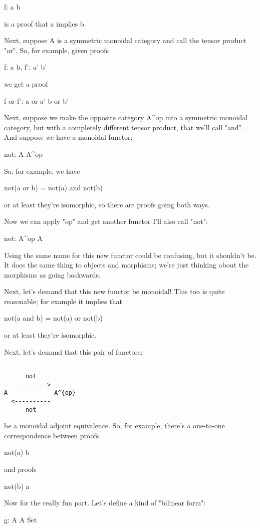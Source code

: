 f: a \to  b


is a proof that a implies b. 

Next, suppose A is a symmetric monoidal category and call the tensor
product "or".  So, for example, given proofs

f: a \to  b,  f': a' \to  b'

we get a proof

f or f': a or a' \to  b or b'


Next, suppose we make the opposite category A^{op} into a
symmetric monoidal category, but with a completely different tensor
product, that we'll call "and".  And suppose we have a
monoidal functor:

not: A \to  A^{op}

So, for example, we have

not(a or b) = not(a) and not(b)

or at least they're isomorphic, so there are proofs going both ways.  

Now we can apply "op" and get another functor I'll also call
"not":

not: A^{op} \to  A

Using the same name for this new functor could be confusing, but it 
shouldn't be.  It does the same thing to objects and morphisms; we're
just thinking about the morphisms as going backwards.
 
Next, let's demand that this new functor be monoidal!  This too is 
quite reasonable; for example it implies that

not(a and b) = not(a) or not(b)

or at least they're isomorphic.

Next, let's demand that this pair of functors:


\begin{verbatim}

      not
   --------->
A             A^{op}
  <----------
      not

\end{verbatim}
    
be a monoidal adjoint equivalence.  So, for example, there's a
one-to-one correspondence between proofs

not(a) \to  b

and proofs

not(b) \to  a

Now for the really fun part.
Let's define a kind of "bilinear form":

g: A \times  A \to  Set

